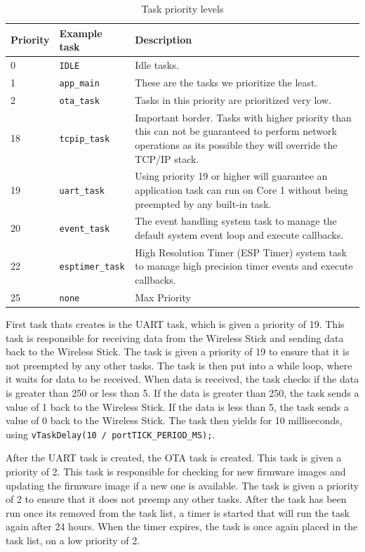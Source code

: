 \begin{table}[ht]
  \centering
  \caption{Task priority levels}
  \label{table:task-priorities}
  \begin{tabularx}{\textwidth}{p{1cm}Xp{10cm}}
    \hline
    \textbf{Priority} & \textbf{Example task} & \textbf{Description} \\ 
    \hline
    0 & \texttt{IDLE} & Idle tasks. \\
    \hline
    1 & \texttt{app\_main} & These are the tasks we prioritize the least.\\
    \hline
    2 & \texttt{ota\_task} & Tasks in this priority are prioritized very low.\\
    \hline
    18 & \texttt{tcpip\_task} & Important border. Tasks with higher priority than this can not be guaranteed to perform network operations as its possible they will override the TCP/IP stack. \\
    \hline
    19 & \texttt{uart\_task} & Using priority 19 or higher will guarantee an application task can run on Core 1 without being preempted by any built-in task\cite{espressif:esp-idf-programming-guide}. \\
    \hline
    20 & \texttt{event\_task} & The event handling system task to manage the default system event loop and execute callbacks. \\
    \hline
    22 & \texttt{esptimer\_task} & High Resolution Timer (ESP Timer) system task to manage high precision timer events and execute callbacks. \\
    \hline
    25 & \texttt{none} & Max Priority \\
    \hline
  \end{tabularx}
\end{table}

First task thats creates is the UART task, which is given a priority of 19. This task is responsible for receiving data from the Wireless Stick and sending data back to the Wireless Stick. The task is given a priority of 19 to ensure that it is not preempted by any other tasks. The task is then put into a while loop, where it waits for data to be received. When data is received, the task checks if the data is greater than 250 or less than 5. If the data is greater than 250, the task sends a value of 1 back to the Wireless Stick. If the data is less than 5, the task sends a value of 0 back to the Wireless Stick. The task then yields for 10 milliseconds, using \texttt{vTaskDelay(10 / portTICK\_PERIOD\_MS);}.

After the UART task is created, the OTA task is created. This task is given a priority of 2. This task is responsible for checking for new firmware images and updating the firmware image if a new one is available. The task is given a priority of 2 to ensure that it does not preemp any other tasks. After the task has been run once its removed from the task list, a timer is started that will run the task again after 24 hours. When the timer expires, the task is once again placed in the task list, on a low priority of 2.
